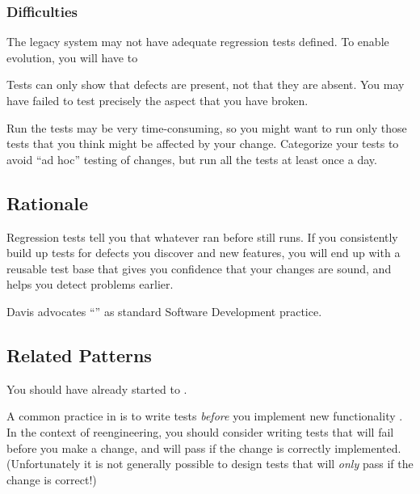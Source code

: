 \documentclass[a4paper,10pt,twoside]{book}
\begin{document}
\subsubsection*{Difficulties}

\begin{bulletlist}
\item The legacy system may not have adequate regression tests defined. To enable evolution, you will have to 

\item Tests can only show that defects are present, not that they are absent. You may have failed to test precisely the aspect that you have broken.

\item Run the tests may be very time-consuming, so you might want to run only those tests that you think might be affected by your change. Categorize your tests to avoid ``ad hoc'' testing of changes, but run all the tests at least once a day.
\end{bulletlist}

\subsection*{Rationale}

Regression tests tell you that whatever ran before still runs. If you consistently build up tests for defects you discover and new features, you will end up with a reusable test base that gives you confidence that your changes are sound, and helps you detect problems earlier.

Davis advocates ``'' \cite{Davi95a} as standard Software Development practice.

\subsection*{Related Patterns}

You should have already started to . 

A common practice in  is to write tests \emph{before} you implement new functionality \cite{Jeff01a}. In the context of reengineering, you should consider writing tests that will fail before you make a change, and will pass if the change is correctly implemented. (Unfortunately it is not generally possible to design tests that will \emph{only} pass if the change is correct!)
\end{document}
